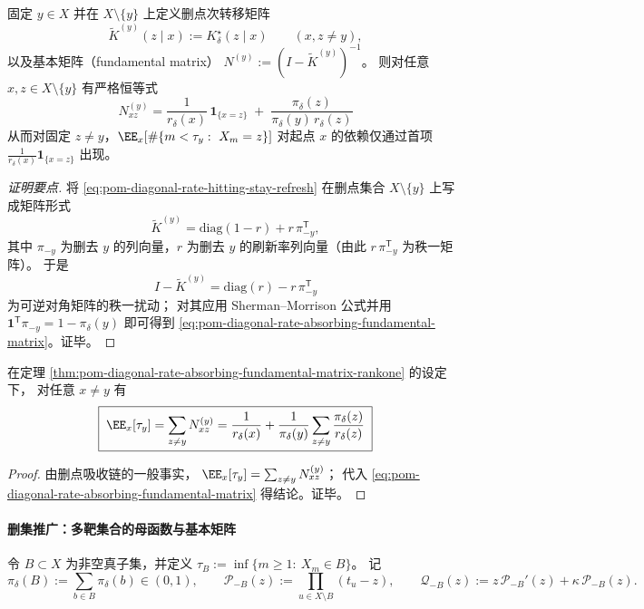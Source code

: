 \begin{theorem}[删点基本矩阵的秩一闭式]\label{thm:pom-diagonal-rate-absorbing-fundamental-matrix-rankone}
固定 \(y\in X\) 并在 \(X\setminus\{y\}\) 上定义删点次转移矩阵
\[
\widetilde K^{(y)}(z\mid x):=K^\star_\delta(z\mid x)\qquad(x,z\ne y),
\]
以及基本矩阵（fundamental matrix）
\(
N^{(y)}:=(I-\widetilde K^{(y)})^{-1}
\)。
则对任意 \(x,z\in X\setminus\{y\}\) 有严格恒等式
\begin{equation}\label{eq:pom-diagonal-rate-absorbing-fundamental-matrix}
\boxed{\;
N^{(y)}_{xz}
=\frac{1}{r_\delta(x)}\,\mathbf 1_{\{x=z\}}
\;+\;
\frac{\pi_\delta(z)}{\pi_\delta(y)\,r_\delta(z)}\;}
\end{equation}
从而对固定 \(z\ne y\)，\(\EE_x[\#\{m<\tau_y:\ X_m=z\}]\) 对起点 \(x\) 的依赖仅通过首项 \(\frac{1}{r_\delta(x)}\mathbf 1_{\{x=z\}}\) 出现。
\end{theorem}
\begin{proof}[证明要点]
将 \eqref{eq:pom-diagonal-rate-hitting-stay-refresh} 在删点集合 \(X\setminus\{y\}\) 上写成矩阵形式
\[
\widetilde K^{(y)}=\mathrm{diag}(1-r)+r\,\pi_{-y}^{\mathsf T},
\]
其中 \(\pi_{-y}\) 为删去 \(y\) 的列向量，\(r\) 为删去 \(y\) 的刷新率列向量（由此 \(r\,\pi_{-y}^{\mathsf T}\) 为秩一矩阵）。
于是
\[
I-\widetilde K^{(y)}=\mathrm{diag}(r)-r\,\pi_{-y}^{\mathsf T}
\]
为可逆对角矩阵的秩一扰动；
对其应用 Sherman--Morrison 公式并用
\(
\mathbf{1}^{\mathsf T}\pi_{-y}=1-\pi_\delta(y)
\)
即可得到 \eqref{eq:pom-diagonal-rate-absorbing-fundamental-matrix}。证毕。
\end{proof}

\begin{corollary}[命中时均值的闭式]\label{cor:pom-diagonal-rate-absorbing-mean-hit-time}
在定理 \ref{thm:pom-diagonal-rate-absorbing-fundamental-matrix-rankone} 的设定下，
对任意 \(x\ne y\) 有
\[
\boxed{\;
\EE_x[\tau_y]
=\sum_{z\ne y}N^{(y)}_{xz}
=\frac{1}{r_\delta(x)}+\frac{1}{\pi_\delta(y)}\sum_{z\ne y}\frac{\pi_\delta(z)}{r_\delta(z)}\;}
\]
\end{corollary}
\begin{proof}
由删点吸收链的一般事实，
\(
\EE_x[\tau_y]=\sum_{z\ne y}N^{(y)}_{xz}
\)；
代入 \eqref{eq:pom-diagonal-rate-absorbing-fundamental-matrix} 得结论。证毕。
\end{proof}

\paragraph{删集推广：多靶集合的母函数与基本矩阵}
令 \(B\subset X\) 为非空真子集，并定义 \(\tau_B:=\inf\{m\ge 1:\ X_m\in B\}\)。
记
\[
\pi_\delta(B):=\sum_{b\in B}\pi_\delta(b)\in(0,1),
\qquad
\mathcal P_{-B}(z):=\prod_{u\in X\setminus B}(t_u-z),
\qquad
\mathcal Q_{-B}(z):=z\,\mathcal P_{-B}'(z)+\kappa\,\mathcal P_{-B}(z).
\]

